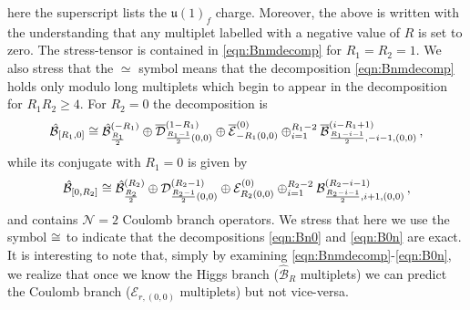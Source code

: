 \documentclass[main.tex]{subfiles}
\begin{document}
here the superscript lists the $\mathfrak{u}(1)_f$ charge. Moreover, the above is written with the understanding that any multiplet labelled with a negative value of $R$ is set to zero. The stress-tensor is contained in \eqref{eqn:Bnmdecomp} for $R_1=R_2=1$. We also stress that the $\simeq$ symbol means that the decomposition \eqref{eqn:Bnmdecomp} holds only modulo long multiplets which begin to appear in the decomposition for $R_1R_2\geq4$. For $R_2=0$ the decomposition is
\begin{equation}\label{eqn:Bn0}
\hat{\mathcal{B}}_{[R_1,0]}\color{black}\cong\hat{\mathcal{B}}^{(-R_1)}_{\frac{R_1}{2}}\oplus\overline{\mathcal{D}}^{(1-R_1)}_{\frac{R_1-1}{2}(0,0)}\oplus \overline{\mathcal{E}}_{-R_1(0,0)}^{(0)}\oplus_{i=1}^{R_1-2}\overline{\mathcal{B}}^{(i-R_1+1)}_{\frac{R_1-i-1}{2},-i-1,(0,0)}\,,
\end{equation}
while its conjugate with $R_1=0$ is given by
\begin{equation}\label{eqn:B0n}
\hat{\mathcal{B}}_{[0,R_2]}\color{black}\cong\hat{\mathcal{B}}^{(R_2)}_{\frac{R_2}{2}}\oplus\mathcal{D}_{\frac{R_2-1}{2}(0,0)}^{(R_2-1)}\oplus \mathcal{E}^{(0)}_{R_2(0,0)}\oplus_{i=1}^{R_2-2}\mathcal{B}^{(R_2-i-1)}_{\frac{R_2-i-1}{2},i+1,(0,0)}\,,
\end{equation}
and contains $\mathcal{N}=2$ Coulomb branch operators. We stress that here we use the symbol $\cong$ to indicate that the decompositions \eqref{eqn:Bn0} and \eqref{eqn:B0n} are exact. It is interesting to note that, simply by examining \eqref{eqn:Bnmdecomp}-\eqref{eqn:B0n}, we realize that once we know the Higgs branch ($\mathcal{\hat{B}}_R$ multiplets) we can predict the Coulomb branch ($\mathcal{E}_{r,(0,0)}$ multiplets) but not vice-versa.
\begin{comment}
For completeness we also list the branching that we used for
\begin{equation}
\mathfrak{su}(3)\oplus\mathfrak{u}(1)_{r_{\mathcal{N}=3}}\to\mathfrak{su}(2)_R\oplus\mathfrak{u}(1)_{r}\oplus\mathfrak{u}(1)_{f}\,,
\end{equation}
where
\begin{equation}
\begin{aligned}
\mathbf{[R_1,R_2]}_{\frac{2R_2-2R_1}{3}}\to&\bigoplus_{j=0}^{R_2-1}\bigoplus_{i=0}^{j}\left(\mathbf{\frac{j}{2}}\right)_{R_2-R_1+j-2i}^{2i-j}\oplus\bigoplus_{j=R_2}^{R_1}\bigoplus_{i=0}^{R_2}\left(\mathbf{\frac{j}{2}}\right)_{R_2-R_1+j-2i}^{2i-j}\\
&\oplus\bigoplus_{j=R_1+1}^{R_1+R_2}\bigoplus_{i=0}^{R_2+R_1-j}\left(\mathbf{\frac{j}{2}}\right)_{R_2+R_1-j-2i}^{2i-2R_1+j}\,,
\end{aligned}
\end{equation}
here the notation is $\left(\mathbf{R}\right)_r^f$.
\end{comment}
\end{document}
